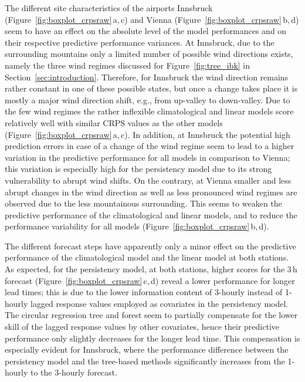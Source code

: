 \documentclass{statsoc}
\begin{document}
The different site characteristics of the airports Innsbruck
(Figure~\ref{fig:boxplot_crpsraw}\,a,\,c) and Vienna
(Figure~\ref{fig:boxplot_crpsraw}\,b,\,d) seem to have an effect on the
absolute level of the model performances and on their respective predictive
performance variances. At Innsbruck, due to the surrounding mountains only a
limited number of possible wind directions exists, namely the three wind
regimes discussed for Figure~\ref{fig:tree_ibk} in
Section~\ref{sec:introduction}. Therefore, for Innsbruck the wind direction
remains rather constant in one of these possible states, but once a change
takes place it is mostly a major wind direction shift, e.g., from up-valley to
down-valley. Due to the few wind regimes the rather inflexible climatological
and linear models score relatively well with similar CRPS values as the other
models (Figure~\ref{fig:boxplot_crpsraw}\,a,\,c). In addition, at Innsbruck the
potential high prediction errors in case of a change of the wind regime seem to
lead to a higher variation in the predictive performance for all models in
comparison to Vienna; this variation is especially high for the persistency
model due to its strong vulnerability to abrupt wind shifts. On the contrary,
at Vienna smaller and less abrupt changes in the wind direction as well as less
pronounced wind regimes are observed due to the less mountainous surrounding.
This seems to weaken the predictive performance of the climatological and
linear models, and to reduce the performance variability for all models
(Figure~\ref{fig:boxplot_crpsraw}\,b,\,d).

The different forecast steps have apparently only a minor effect on the
predictive performance of the climatological model and the linear model at both
stations. As expected, for the persistency model, at both stations, higher
scores for the $3$\,h forecast (Figure~\ref{fig:boxplot_crpsraw}\,c,\,d) reveal
a lower performance for longer lead times; this is due to the lower information
content of 3-hourly instead of 1-hourly lagged response values employed as
covariates in the persistency model. The circular regression tree and forest
seem to partially compensate for the lower skill of the lagged response values
by other covariates, hence their predictive performance only slightly decreases
for the longer lead time. This compensation is especially evident for
Innsbruck, where the performance difference between the persistency model and
the tree-based methods significantly increases from the 1-hourly to the
3-hourly forecast.
\end{document}
